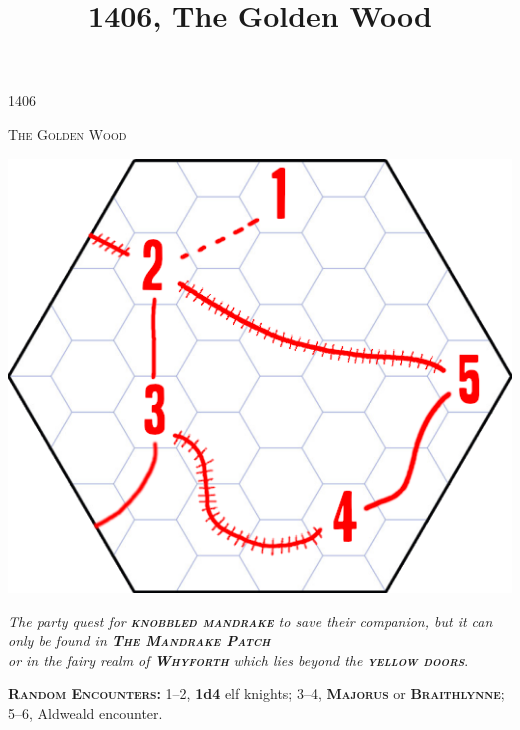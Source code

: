 \documentclass[10pt]{article}
\title{1406, The Golden Wood}
\newcommand\locationcolour{Mahogany}
\newcommand\npccolour{CornflowerBlue}
\newcommand{\keyword}[1]{\textsc{\textbf{#1}}}
\newcommand{\location}[1]{\keyword{\color{\locationcolour}#1}}
\newcommand{\npc}[1]{\keyword{\color{\npccolour}#1}}
\begin{document}
\begin{center}
{\Huge 1406}

{\large \textsc{The Golden Wood}}

\includegraphics[scale=0.5]{hexmap}

\emph{The party quest for \keyword{knobbled mandrake} to save their
companion, but it can only be found in \location{The Mandrake
  Patch}\\or in the fairy realm of \location{Whyforth} which lies
beyond the \keyword{yellow doors}}.

\keyword{Random Encounters:}
1--2, \textbf{1d4} elf knights;
3--4, \npc{Majorus} or \npc{Braithlynne};
5--6, Aldweald encounter.
\end{center}
\end{document}
